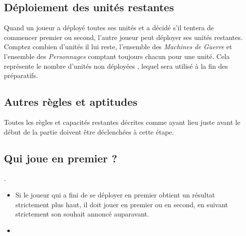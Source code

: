 \subsection*{Déploiement des unités restantes}

Quand un joueur a déployé toutes ses unités et a décidé s'il tentera de commencer premier ou second, l'autre joueur peut déployer ses unités restantes. Comptez combien d'unités il lui reste, l'ensemble des \emph{Machines de Guerre} et l'ensemble des \emph{Personnages} comptant toujours chacun pour une unité. Cela représente le \og nombre d'unités non déployées \fg , lequel sera utilisé à la fin des préparatifs.

\subsection*{Autres règles et aptitudes}

Toutes les règles et capacités restantes décrites comme ayant lieu juste avant le début de la partie doivent être déclenchées à cette étape.

\subsection*{Qui joue en premier ?}

.
\begin{itemize}[label={-}]
\item Si le joueur qui a fini de se déployer en premier obtient un résultat strictement plus haut, il doit jouer en premier ou en second, en suivant strictement son souhait annoncé auparavant.
\item {}
\end{itemize}

